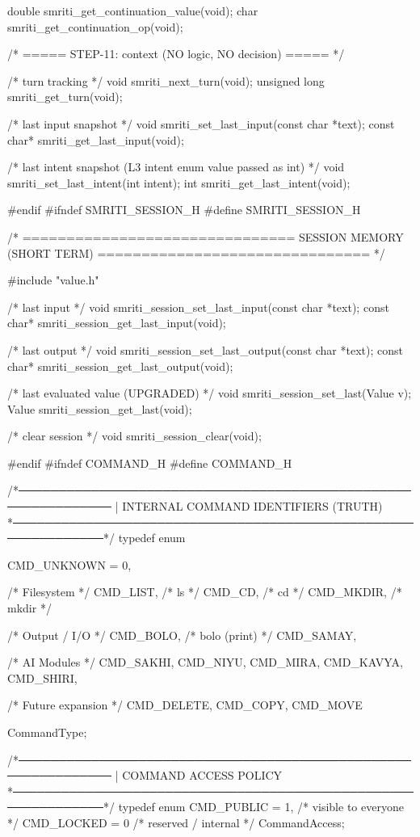 \documentclass{article}
\begin{document}
double smriti_get_continuation_value(void);
char   smriti_get_continuation_op(void);

/* ===== STEP-11: context (NO logic, NO decision) ===== */

/* turn tracking */
void smriti_next_turn(void);
unsigned long smriti_get_turn(void);

/* last input snapshot */
void smriti_set_last_input(const char *text);
const char* smriti_get_last_input(void);

/* last intent snapshot (L3 intent enum value passed as int) */
void smriti_set_last_intent(int intent);
int  smriti_get_last_intent(void);

#endif
#ifndef SMRITI_SESSION_H
#define SMRITI_SESSION_H

/* ===============================
   SESSION MEMORY (SHORT TERM)
   =============================== */

#include "value.h"

/* last input */
void smriti_session_set_last_input(const char *text);
const char* smriti_session_get_last_input(void);

/* last output */
void smriti_session_set_last_output(const char *text);
const char* smriti_session_get_last_output(void);

/* last evaluated value (UPGRADED) */
void smriti_session_set_last(Value v);
Value smriti_session_get_last(void);

/* clear session */
void smriti_session_clear(void);

#endif
#ifndef COMMAND_H
#define COMMAND_H

/*──────────────────────────────────────────────────────────────
 | INTERNAL COMMAND IDENTIFIERS (TRUTH)
 *──────────────────────────────────────────────────────────────*/
typedef enum {

    CMD_UNKNOWN = 0,

    /* Filesystem */
    CMD_LIST,        /* ls */
    CMD_CD,          /* cd */
    CMD_MKDIR,       /* mkdir */

    /* Output / I/O */
    CMD_BOLO,        /* bolo (print) */
    CMD_SAMAY,

/* AI Modules */
    CMD_SAKHI,
    CMD_NIYU,
    CMD_MIRA,
    CMD_KAVYA,
    CMD_SHIRI,

    /* Future expansion */
    CMD_DELETE,
    CMD_COPY,
    CMD_MOVE



} CommandType;


/*──────────────────────────────────────────────────────────────
 | COMMAND ACCESS POLICY
 *──────────────────────────────────────────────────────────────*/
typedef enum {
    CMD_PUBLIC = 1,     /* visible to everyone */
    CMD_LOCKED = 0      /* reserved / internal */
} CommandAccess;
\end{document}
